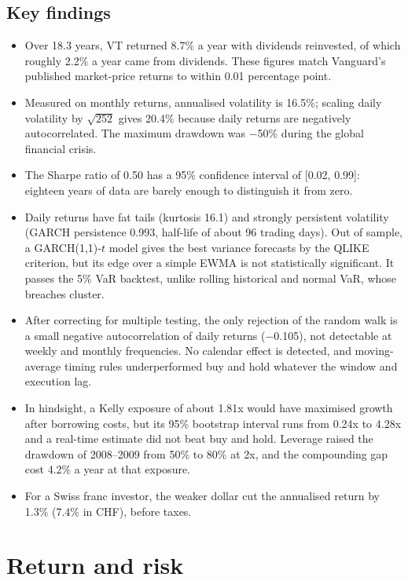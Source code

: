 \documentclass[11pt,a4paper]{article}
\begin{document}
\subsection*{Key findings}
\begin{itemize}[leftmargin=1.2em,itemsep=0.3em,topsep=0.2em]
  \item Over 18.3 years, VT returned 8.7\% a year with dividends reinvested, of which roughly 2.2\% a year came from dividends. These figures match Vanguard's published market-price returns to within 0.01 percentage point.
  \item Measured on monthly returns, annualised volatility is 16.5\%; scaling daily volatility by $\sqrt{252}$ gives 20.4\% because daily returns are negatively autocorrelated. The maximum drawdown was $-$50\% during the global financial crisis.
  \item The Sharpe ratio of 0.50 has a 95\% confidence interval of [0.02, 0.99]: eighteen years of data are barely enough to distinguish it from zero.
  \item Daily returns have fat tails (kurtosis 16.1) and strongly persistent volatility (GARCH persistence 0.993, half-life of about 96 trading days). Out of sample, a GARCH(1,1)-$t$ model gives the best variance forecasts by the QLIKE criterion, but its edge over a simple EWMA is not statistically significant. It passes the 5\% VaR backtest, unlike rolling historical and normal VaR, whose breaches cluster.
  \item After correcting for multiple testing, the only rejection of the random walk is a small negative autocorrelation of daily returns ($-$0.105), not detectable at weekly and monthly frequencies. No calendar effect is detected, and moving-average timing rules underperformed buy and hold whatever the window and execution lag.
  \item In hindsight, a Kelly exposure of about 1.81x would have maximised growth after borrowing costs, but its 95\% bootstrap interval runs from 0.24x to 4.28x and a real-time estimate did not beat buy and hold. Leverage raised the drawdown of 2008--2009 from 50\% to 80\% at 2x, and the compounding gap cost 4.2\% a year at that exposure.
  \item For a Swiss franc investor, the weaker dollar cut the annualised return by 1.3\% (7.4\% in CHF), before taxes.
\end{itemize}

\clearpage
\section{Return and risk}
\end{document}

